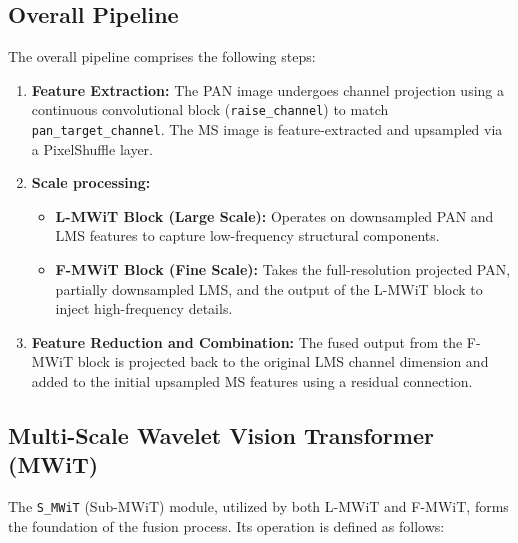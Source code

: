 \documentclass[11pt]{article}
\begin{document}
\subsection{Overall Pipeline}
The overall pipeline comprises the following steps:
\begin{enumerate}
    \item \textbf{Feature Extraction:} The PAN image undergoes channel projection using a continuous convolutional block (\texttt{raise\_channel}) to match \texttt{pan\_target\_channel}. The MS image is feature-extracted and upsampled via a PixelShuffle layer.
    \item \textbf{Scale processing:}
    \begin{itemize}
        \item \textbf{L-MWiT Block (Large Scale):} Operates on downsampled PAN and LMS features to capture low-frequency structural components.
        \item \textbf{F-MWiT Block (Fine Scale):} Takes the full-resolution projected PAN, partially downsampled LMS, and the output of the L-MWiT block to inject high-frequency details.
    \end{itemize}
    \item \textbf{Feature Reduction and Combination:} The fused output from the F-MWiT block is projected back to the original LMS channel dimension and added to the initial upsampled MS features using a residual connection.
\end{enumerate}

\subsection{Multi-Scale Wavelet Vision Transformer (MWiT)}
The \texttt{S\_MWiT} (Sub-MWiT) module, utilized by both L-MWiT and F-MWiT, forms the foundation of the fusion process. Its operation is defined as follows:
\end{document}
